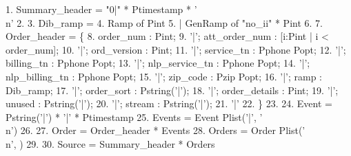 \begin{code}\scriptsize
 1.  Summary\_header = "0|" * Ptimestamp * '\\n'
 2. \mbox{}
 3.  Dib\_ramp = 
 4.   Ramp of Pint 
 5. | GenRamp of "no\_ii" * Pint
 6. \mbox{}
 7.  Order\_header = \{ 
 8.      order\_num : Pint;  
 9. '|'; att\_order\_num : [i:Pint | i < order\_num];  
10. '|'; ord\_version : Pint;  
11. '|'; service\_tn : Pphone Popt;
12. '|'; billing\_tn : Pphone Popt;  
13. '|'; nlp\_service\_tn : Pphone Popt;  
14. '|'; nlp\_billing\_tn : Pphone Popt;  
15. '|'; zip\_code : Pzip Popt;  
16. '|'; ramp : Dib\_ramp;  
17. '|'; order\_sort : Pstring('|');  
18. '|'; order\_details : Pint;
19. '|'; unused : Pstring('|');  
20. '|'; stream : Pstring('|'); 
21. '|'
22. \} 
23. \mbox{}
24.  Event  = Pstring('|') * '|' * Ptimestamp
25.  Events = Event Plist('|', '\\n')
26. \mbox{}
27.  Order  = Order\_header * Events
28.  Orders = Order Plist('\\n', )
29. \mbox{}
30.  Source = Summary\_header * Orders
\end{code}
